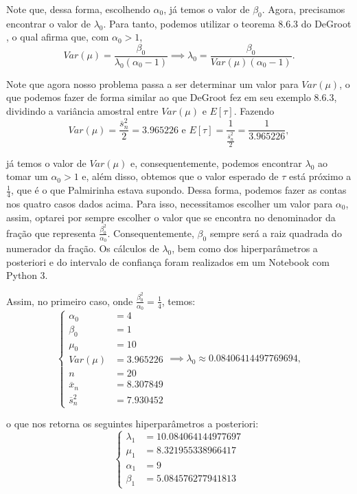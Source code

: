\documentclass{article}
\begin{document}
Note que, dessa forma, escolhendo $\alpha_0$, já temos o valor de $\beta_0$. Agora, precisamos encontrar o valor de $\lambda_0$. Para tanto, podemos utilizar o teorema 8.6.3 do DeGroot \cite{degroot}, o qual afirma que, com $\alpha_0 > 1$,
\[Var(\mu) = \dfrac{\beta_0}{\lambda_0 \left(\alpha_0 - 1\right)} \implies \lambda_0 = \dfrac{\beta_0}{Var(\mu) \left(\alpha_0 - 1\right)}.\]

Note que agora nosso problema passa a ser determinar um valor para $Var(\mu)$, o que podemos fazer de forma similar ao que DeGroot fez em seu exemplo 8.6.3, dividindo a variância amostral entre $Var(\mu)$ e $E[\tau]$. Fazendo
\[Var(\mu) = \dfrac{\overline{s}_n^2}{2} = 3.965226 \text{ e } E[\tau] = \dfrac{1}{\frac{\overline{s}_n^2}{2}} = \dfrac{1}{3.965226},\]

\noindent já temos o valor de $Var(\mu)$ e, consequentemente, podemos encontrar $\lambda_0$ ao tomar um $\alpha_0 > 1$ e, além disso, obtemos que o valor esperado de $\tau$ está próximo a $\frac{1}{4}$, que é o que Palmirinha estava supondo. Dessa forma, podemos fazer as contas nos quatro casos dados acima. Para isso, necessitamos escolher um valor para $\alpha_0$, assim, optarei por sempre escolher o valor que se encontra no denominador da fração que representa $\frac{\beta_0^2}{\alpha_0}$. Consequentemente, $\beta_0$ sempre será a raiz quadrada do numerador da fração. Os cálculos de $\lambda_0$, bem como dos hiperparâmetros a posteriori e do intervalo de confiança foram realizados em um Notebook com Python 3.

Assim, no primeiro caso, onde $\frac{\beta_0^2}{\alpha_0} = \frac{1}{4}$, temos:
\begin{equation*}
    \left\{
        \begin{array}{ll}
            \alpha_0 & = 4 \\
            \beta_0 & = 1 \\
            \mu_0 & = 10 \\
            Var(\mu) & = 3.965226 \\
            n & = 20 \\
            \overline{x}_n & = 8.307849 \\
            \overline{s}_n^2 & = 7.930452
        \end{array}
    \right.
    \implies \lambda_0 \approx 0.08406414497769694,
\end{equation*}

\noindent o que nos retorna os seguintes hiperparâmetros a posteriori:
\begin{equation*}
    \left\{
        \begin{array}{ll}
            \lambda_1 & = 10.084064144977697 \\
            \mu_1 & = 8.321955338966417 \\
            \alpha_1 & = 9 \\
            \beta_1 & = 5.084576277941813
        \end{array}
    \right.
\end{equation*}
\end{document}
